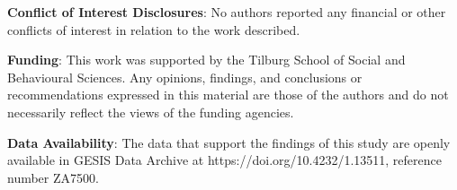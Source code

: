 \documentclass[]{./cls/interact}
\theoremstyle{plain}
\theoremstyle{definition}
\theoremstyle{remark}
\newcommand{\pathBIB}{./bib}
\begin{document}
\textbf{Conflict of Interest Disclosures}: No authors reported any financial or other conflicts 
of interest in relation to the work described.

\textbf{Funding}: This work was supported by the Tilburg School of Social and Behavioural Sciences.
Any opinions, findings, and conclusions or recommendations expressed in this material are those of the authors
and do not necessarily reflect the views of the funding agencies.

\textbf{Data Availability}: The data that support the findings of this study are openly available 
in GESIS Data Archive at https://doi.org/10.4232/1.13511, reference number ZA7500.

 


\end{document}
